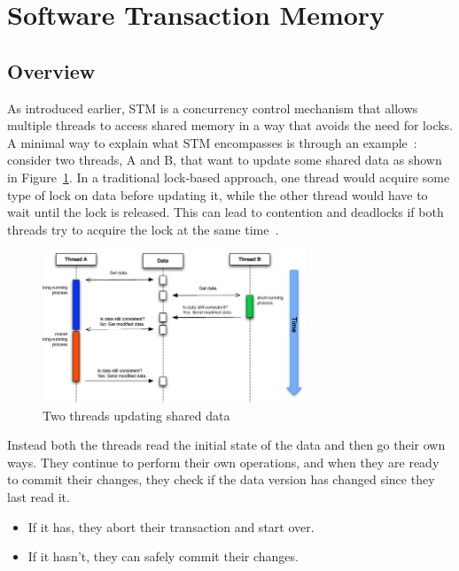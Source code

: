 \section{Software Transaction Memory\label{sec:stm}}

\subsection {Overview}
As introduced earlier, STM is a concurrency control mechanism that allows multiple threads to access shared memory in a way that avoids the need for locks.\\

A minimal way to explain what STM encompasses is through an example~: consider two threads, A and B, that want to update some shared data as shown in Figure~\ref{fig:STM.jpg}. In a traditional lock-based approach, one thread would acquire some type of lock on data before updating it, while the other thread would have to wait until the lock is released. This can lead to contention and deadlocks if both threads try to acquire the lock at the same time~\cite{shavit1995software,kestlerBMC}.

\begin{figure}[H]
    \centering
    \includegraphics[width=0.7\textwidth]{STM.jpg}
    \caption{Two threads updating shared data~\cite{kestlerBMC}}
    \label{fig:STM.jpg}
\end{figure}

Instead both the threads read the initial state of the data and then go their own ways. They continue to perform their own operations, and when they are ready to commit their changes, they check if the data version has changed since they last read it. 
\begin{itemize}
    \item If it has, they abort their transaction and start over. 
    \item If it hasn't, they can safely commit their changes. 
\end{itemize}

